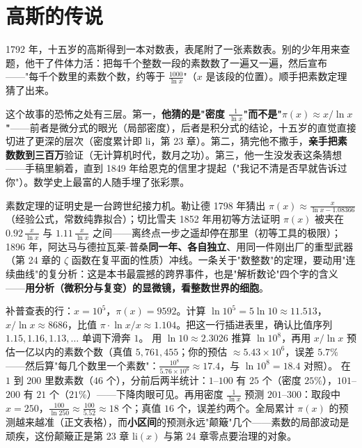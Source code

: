 \section{高斯的传说}

1792 年，十五岁的高斯得到一本对数表，表尾附了一张素数表。别的少年用来查题，他干了件体力活：把每千个整数一段的素数数了一遍又一遍，然后宣布——"每千个数里的素数个数，约等于 $\tfrac{1000}{\ln x}$"（$x$ 是该段的位置）。顺手把素数定理猜了出来。

这个故事的恐怖之处有三层。第一，\textbf{他猜的是"密度 $\tfrac1{\ln x}$"而不是"$\pi(x)\approx x/\ln x$"}——前者是微分式的眼光（局部密度），后者是积分式的结论，十五岁的直觉直接切进了更深的层次（密度累计即 $\mathrm{li}$，第 23 章）。第二，猜完他不撒手，\textbf{亲手把素数数到三百万}验证（无计算机时代，数月之功）。第三，他一生没发表这条猜想——手稿里躺着，直到 1849 年给恩克的信里才提起（"我记不清是否早就告诉过你"）。数学史上最富的人随手埋了张彩票。

\begin{lishi}
素数定理的证明史是一台跨世纪接力机。勒让德 1798 年猜出 $\pi(x) \approx \tfrac{x}{\ln x - 1.08366}$（经验公式，常数纯靠拟合）；切比雪夫 1852 年用初等方法证明 $\pi(x)$ 被夹在 $0.92\,\tfrac{x}{\ln x}$ 与 $1.11\,\tfrac{x}{\ln x}$ 之间——离终点一步之遥却停在那里（初等工具的极限）；1896 年，阿达马与德拉瓦莱-普桑\textbf{同一年、各自独立}、用同一件刚出厂的重型武器（第 24 章的 $\zeta$ 函数在复平面的性质）冲线。一条关于"数整数"的定理，要动用"连续曲线"的复分析：这是本书最震撼的跨界事件，也是"解析数论"四个字的含义——\textbf{用分析（微积分与复变）的显微镜，看整数世界的细胞}。
\end{lishi}

\begin{dongshou}
\begin{itemize}
  \yisi 补普查表的行：$x = 10^5$，$\pi(x) = 9592$。计算 $\ln 10^5 = 5\ln10 \approx 11.513$，$x/\ln x \approx 8686$，比值 $\pi\cdot\ln x/x \approx 1.104$。把这一行插进表里，确认比值序列 $1.15, 1.16, 1.13, \dots$ 单调下滑奔 $1$。
  \yier 用 $\ln10 \approx 2.3026$ 推算 $\ln 10^8$，再用 $x/\ln x$ 预估一亿以内的素数个数（真值 $5{,}761{,}455$；你的预估 $\approx 5.43\times10^6$，误差 $5.7\%$——然后算"每几个数里一个素数"：$\tfrac{10^8}{5.76\times10^6} \approx 17.4$，与 $\ln 10^8 = 18.4$ 对照）。
  \yier 在 $1$ 到 $200$ 里数素数（$46$ 个），分前后两半统计：$1$--$100$ 有 $25$ 个（密度 $25\%$），$101$--$200$ 有 $21$ 个（$21\%$）——下降肉眼可见。再用密度 $\tfrac1{\ln x}$ 预测 $201$--$300$：取段中 $x = 250$，$\tfrac{100}{\ln 250} \approx \tfrac{100}{5.52} \approx 18$ 个；真值 $16$ 个，误差约两个。全局累计 $\pi(x)$ 的预测越来越准（正文表格），而\textbf{小区间}的预测永远"颠簸"几个——素数的局部波动是顽疾，这份颠簸正是第 23 章 $\mathrm{li}(x)$ 与第 24 章零点要治理的对象。
\end{itemize}
\end{dongshou}

